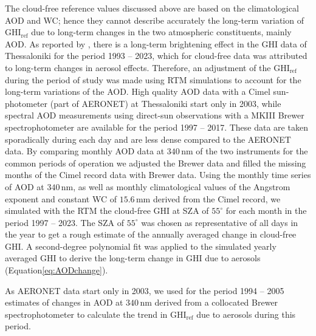 \documentclass[preprint, 5p,
authoryear]{elsarticle} %
\begin{document}
The cloud-free reference values discussed above are based on the
climatological AOD and WC; hence they cannot describe accurately the
long-term variation of \(\text{GHI}_\text{ref}\) due to long-term
changes in the two atmospheric constituents, mainly AOD. As reported by
\citet{Natsis2023}, there is a long-term brightening effect in the GHI
data of Thessaloniki for the period 1993 -- 2023, which for cloud-free
data was attributed to long-term changes in aerosol effects. Therefore,
an adjustment of the \(\text{GHI}_\text{ref}\) during the period of
study was made using RTM simulations to account for the long-term
variations of the AOD. High quality AOD data with a Cimel sun-photometer
(part of AERONET) at Thessaloniki start only in 2003, while spectral AOD
measurements using direct-sun observations with a MKIII Brewer
spectrophotometer are available for the period 1997 -- 2017. These data
are taken sporadically during each day and are less dense compared to
the AERONET data. By comparing monthly AOD data at \(340\,\text{nm}\) of
the two instruments for the common periods of operation we adjusted the
Brewer data and filled the missing months of the Cimel record data with
Brewer data. Using the monthly time series of AOD at \(340\,\text{nm}\),
as well as monthly climatological values of the Angstrom exponent and
constant WC of \(15.6\,\text{mm}\) derived from the Cimel record, we
simulated with the RTM the cloud-free GHI at SZA of \(55^\circ\) for
each month in the period 1997 -- 2023. The SZA of \(55^\circ\) was
chosen as representative of all days in the year to get a rough estimate
of the annually averaged change in cloud-free GHI. A second-degree
polynomial fit was applied to the simulated yearly averaged GHI to
derive the long-term change in GHI due to aerosols
(Equation\nobreakspace{}\ref{eq:AODchange}).

As AERONET data start only in 2003, we used for the period 1994 -- 2005
estimates of changes in AOD at \(340\,\text{nm}\) derived from a
collocated Brewer spectrophotometer \citep{Kazadzis2007} to calculate
the trend in \(\text{GHI}_\text{ref}\) due to aerosols during this
period.
\end{document}
